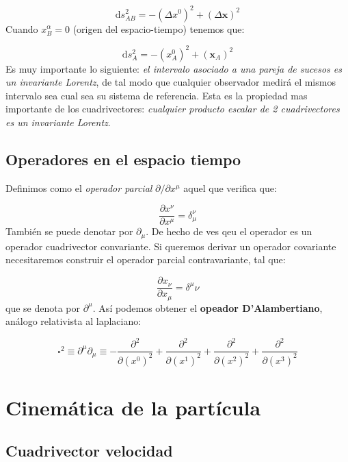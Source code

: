 \documentclass[12pt,a4paper]{book}
\numberwithin{equation}{section}
\numberwithin{figure}{section}
\newcommand{\parciales}[2]{\frac{\partial #1}{\partial #2}}
\newcommand{\D}{\mathrm{d}}
\newcommand{\xn}{\mathbf{x}}
\begin{document}
\begin{equation}
\D s_{AB}^2 = - (\Delta x^{0})^2 + (\Delta \xn)^2
\end{equation}
Cuando $x_{B}^\alpha = 0$ (origen del espacio-tiempo) tenemos que:

\begin{equation}
\D s_A^2 = - (x_A^0)^2 + (\xn_A)^2
\end{equation}
Es muy importante lo siguiente: \textit{el intervalo asociado a una pareja de sucesos es un invariante Lorentz}, de tal modo que cualquier observador medirá el mismos intervalo sea cual sea su sistema de referencia. Esta es la propiedad mas importante de los cuadrivectores: \textit{cualquier producto escalar de 2 cuadrivectores es un invariante Lorentz}. \\

\subsection{Operadores en el espacio tiempo}

Definimos como el \textit{operador parcial} $\partial / \partial x^{\mu}$ aquel que verifica que:

\begin{equation}
\parciales{x^{\nu}}{x^{\mu}} = \delta_{\mu}^{\nu}
\end{equation}
También se puede denotar por $\partial_\mu$. De hecho de ves qeu el operador es un operador cuadrivector convariante. Si queremos derivar un operador covariante necesitaremos construir el operador parcial contravariante, tal que:

\begin{equation}
\parciales{x_{\nu}}{x_{\mu}} = \delta^{\mu}{\nu}
\end{equation}
que se denota por $\partial^{\mu}$. Así podemos obtener el \textbf{opeador D'Alambertiano}, análogo relativista al laplaciano:

\begin{equation}
\square^2 \equiv \partial^\mu \partial_\mu \equiv - \parciales{^2}{(x^0)^2} + \parciales{^2}{(x^1)^2} + \parciales{^2}{(x^2)^2}  + \parciales{^2}{(x^3)^2} 
\end{equation}


\section{Cinemática de la partícula}
\subsection{Cuadrivector velocidad}
\end{document}
